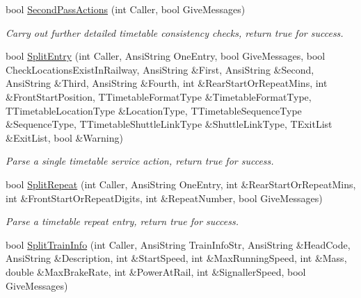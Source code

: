 \begin{DoxyCompactItemize}
\item 
\mbox{\label{class_t_train_controller_a193bc964187b0ae255251d2c7136540a}} 
bool \mbox{\hyperlink{class_t_train_controller_a193bc964187b0ae255251d2c7136540a}{Second\+Pass\+Actions}} (int Caller, bool Give\+Messages)
\begin{DoxyCompactList}\small\item\em Carry out further detailed timetable consistency checks, return true for success. \end{DoxyCompactList}\item 
\mbox{\label{class_t_train_controller_a9067975adc343b753d7eb882648c66bb}} 
bool \mbox{\hyperlink{class_t_train_controller_a9067975adc343b753d7eb882648c66bb}{Split\+Entry}} (int Caller, Ansi\+String One\+Entry, bool Give\+Messages, bool Check\+Locations\+Exist\+In\+Railway, Ansi\+String \&First, Ansi\+String \&Second, Ansi\+String \&Third, Ansi\+String \&Fourth, int \&Rear\+Start\+Or\+Repeat\+Mins, int \&Front\+Start\+Position, T\+Timetable\+Format\+Type \&Timetable\+Format\+Type, T\+Timetable\+Location\+Type \&Location\+Type, T\+Timetable\+Sequence\+Type \&Sequence\+Type, T\+Timetable\+Shuttle\+Link\+Type \&Shuttle\+Link\+Type, T\+Exit\+List \&Exit\+List, bool \&Warning)
\begin{DoxyCompactList}\small\item\em Parse a single timetable service action, return true for success. \end{DoxyCompactList}\item 
\mbox{\label{class_t_train_controller_a03d63b7579e50c092cca3b5200d9dafb}} 
bool \mbox{\hyperlink{class_t_train_controller_a03d63b7579e50c092cca3b5200d9dafb}{Split\+Repeat}} (int Caller, Ansi\+String One\+Entry, int \&Rear\+Start\+Or\+Repeat\+Mins, int \&Front\+Start\+Or\+Repeat\+Digits, int \&Repeat\+Number, bool Give\+Messages)
\begin{DoxyCompactList}\small\item\em Parse a timetable repeat entry, return true for success. \end{DoxyCompactList}\item 
\mbox{\label{class_t_train_controller_afa4be4bca19620319c9e65eb0b43daa1}} 
bool \mbox{\hyperlink{class_t_train_controller_afa4be4bca19620319c9e65eb0b43daa1}{Split\+Train\+Info}} (int Caller, Ansi\+String Train\+Info\+Str, Ansi\+String \&Head\+Code, Ansi\+String \&Description, int \&Start\+Speed, int \&Max\+Running\+Speed, int \&Mass, double \&Max\+Brake\+Rate, int \&Power\+At\+Rail, int \&Signaller\+Speed, bool Give\+Messages)

\end{DoxyCompactItemize}
